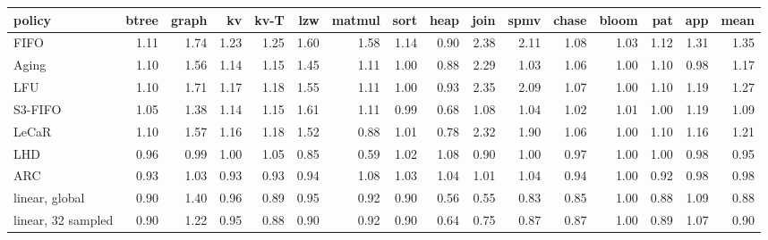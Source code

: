 \begin{tabular}{lrrrrrrrrrrrrrrr}
\toprule
policy & btree & graph & kv & kv-T & lzw & matmul & sort & heap & join & spmv & chase & bloom & pat & app & mean \\
\midrule
FIFO & 1.11 & 1.74 & 1.23 & 1.25 & 1.60 & 1.58 & 1.14 & 0.90 & 2.38 & 2.11 & 1.08 & 1.03 & 1.12 & 1.31 & 1.35 \\
Aging & 1.10 & 1.56 & 1.14 & 1.15 & 1.45 & 1.11 & 1.00 & 0.88 & 2.29 & 1.03 & 1.06 & 1.00 & 1.10 & 0.98 & 1.17 \\
LFU & 1.10 & 1.71 & 1.17 & 1.18 & 1.55 & 1.11 & 1.00 & 0.93 & 2.35 & 2.09 & 1.07 & 1.00 & 1.10 & 1.19 & 1.27 \\
S3-FIFO & 1.05 & 1.38 & 1.14 & 1.15 & 1.61 & 1.11 & 0.99 & 0.68 & 1.08 & 1.04 & 1.02 & 1.01 & 1.00 & 1.19 & 1.09 \\
LeCaR & 1.10 & 1.57 & 1.16 & 1.18 & 1.52 & 0.88 & 1.01 & 0.78 & 2.32 & 1.90 & 1.06 & 1.00 & 1.10 & 1.16 & 1.21 \\
LHD & 0.96 & 0.99 & 1.00 & 1.05 & 0.85 & 0.59 & 1.02 & 1.08 & 0.90 & 1.00 & 0.97 & 1.00 & 1.00 & 0.98 & 0.95 \\
ARC & 0.93 & 1.03 & 0.93 & 0.93 & 0.94 & 1.08 & 1.03 & 1.04 & 1.01 & 1.04 & 0.94 & 1.00 & 0.92 & 0.98 & 0.98 \\
linear, global & 0.90 & 1.40 & 0.96 & 0.89 & 0.95 & 0.92 & 0.90 & 0.56 & 0.55 & 0.83 & 0.85 & 1.00 & 0.88 & 1.09 & 0.88 \\
linear, 32 sampled & 0.90 & 1.22 & 0.95 & 0.88 & 0.90 & 0.92 & 0.90 & 0.64 & 0.75 & 0.87 & 0.87 & 1.00 & 0.89 & 1.07 & 0.90 \\
\bottomrule
\end{tabular}
